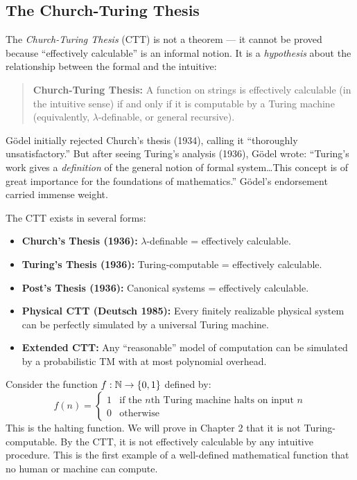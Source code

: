 \subsection{The Church-Turing Thesis}
\label{sec:computation:ctt}

The \emph{Church-Turing Thesis} (CTT) is not a theorem --- it cannot be proved because ``effectively calculable'' is an informal notion. It is a \emph{hypothesis} about the relationship between the formal and the intuitive:

\begin{quote}
\textbf{Church-Turing Thesis:} A function on strings is effectively calculable (in the intuitive sense) if and only if it is computable by a Turing machine (equivalently, $\lambda$-definable, or general recursive).
\end{quote}

\begin{historicalnote}
G\"odel initially rejected Church's thesis (1934), calling it ``thoroughly unsatisfactory.'' But after seeing Turing's analysis (1936), G\"odel wrote: ``Turing's work gives a \emph{definition} of the general notion of formal system\ldots This concept is of great importance for the foundations of mathematics.'' G\"odel's endorsement carried immense weight.
\end{historicalnote}

The CTT exists in several forms:
\begin{itemize}
\item \textbf{Church's Thesis (1936):} $\lambda$-definable = effectively calculable.
\item \textbf{Turing's Thesis (1936):} Turing-computable = effectively calculable.
\item \textbf{Post's Thesis (1936):} Canonical systems = effectively calculable.
\item \textbf{Physical CTT (Deutsch 1985):} Every finitely realizable physical system can be perfectly simulated by a universal Turing machine.
\item \textbf{Extended CTT:} Any ``reasonable'' model of computation can be simulated by a probabilistic TM with at most polynomial overhead.
\end{itemize}

\begin{example}
Consider the function $f: \mathbb{N} \to \{0,1\}$ defined by:
\[
f(n) = \begin{cases}
1 & \text{if the $n$th Turing machine halts on input $n$}\\
0 & \text{otherwise}
\end{cases}
\]
This is the halting function. We will prove in Chapter 2 that it is not Turing-computable. By the CTT, it is not effectively calculable by any intuitive procedure. This is the first example of a well-defined mathematical function that no human or machine can compute.
\end{example}

